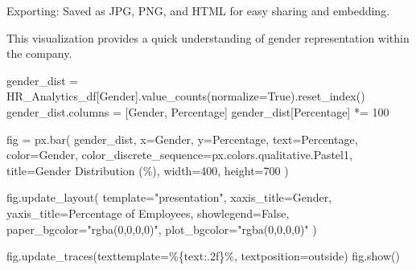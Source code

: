 \documentclass[
  letterpaper,
  DIV=11,
  numbers=noendperiod]{scrartcl}
\newenvironment{Shaded}{\begin{snugshade}}{\end{snugshade}}
\newcommand{\DecValTok}[1]{\textcolor[rgb]{0.68,0.00,0.00}{#1}}
\newcommand{\NormalTok}[1]{\textcolor[rgb]{0.00,0.23,0.31}{#1}}
\newcommand{\OperatorTok}[1]{\textcolor[rgb]{0.37,0.37,0.37}{#1}}
\newcommand{\SpecialCharTok}[1]{\textcolor[rgb]{0.37,0.37,0.37}{#1}}
\newcommand{\StringTok}[1]{\textcolor[rgb]{0.13,0.47,0.30}{#1}}
\newcommand{\VariableTok}[1]{\textcolor[rgb]{0.07,0.07,0.07}{#1}}
\begin{document}
Exporting: Saved as JPG, PNG, and HTML for easy sharing and embedding.

This visualization provides a quick understanding of gender
representation within the company.

\begin{Shaded}
\begin{Highlighting}[]
\NormalTok{gender\_dist }\OperatorTok{=}\NormalTok{ HR\_Analytics\_df[}\StringTok{\textquotesingle{}Gender\textquotesingle{}}\NormalTok{].value\_counts(normalize}\OperatorTok{=}\VariableTok{True}\NormalTok{).reset\_index()}
\NormalTok{gender\_dist.columns }\OperatorTok{=}\NormalTok{ [}\StringTok{\textquotesingle{}Gender\textquotesingle{}}\NormalTok{, }\StringTok{\textquotesingle{}Percentage\textquotesingle{}}\NormalTok{]}
\NormalTok{gender\_dist[}\StringTok{\textquotesingle{}Percentage\textquotesingle{}}\NormalTok{] }\OperatorTok{*=} \DecValTok{100}

\NormalTok{fig }\OperatorTok{=}\NormalTok{ px.bar(}
\NormalTok{    gender\_dist,}
\NormalTok{    x}\OperatorTok{=}\StringTok{\textquotesingle{}Gender\textquotesingle{}}\NormalTok{,}
\NormalTok{    y}\OperatorTok{=}\StringTok{\textquotesingle{}Percentage\textquotesingle{}}\NormalTok{,}
\NormalTok{    text}\OperatorTok{=}\StringTok{\textquotesingle{}Percentage\textquotesingle{}}\NormalTok{,}
\NormalTok{    color}\OperatorTok{=}\StringTok{\textquotesingle{}Gender\textquotesingle{}}\NormalTok{,}
\NormalTok{    color\_discrete\_sequence}\OperatorTok{=}\NormalTok{px.colors.qualitative.Pastel1,}
\NormalTok{    title}\OperatorTok{=}\StringTok{\textquotesingle{}Gender Distribution (\%)\textquotesingle{}}\NormalTok{,}
\NormalTok{    width}\OperatorTok{=}\DecValTok{400}\NormalTok{,     }
\NormalTok{    height}\OperatorTok{=}\DecValTok{700}    
\NormalTok{)}

\NormalTok{fig.update\_layout(}
\NormalTok{    template}\OperatorTok{=}\StringTok{"presentation"}\NormalTok{,}
\NormalTok{    xaxis\_title}\OperatorTok{=}\StringTok{\textquotesingle{}Gender\textquotesingle{}}\NormalTok{,}
\NormalTok{    yaxis\_title}\OperatorTok{=}\StringTok{\textquotesingle{}Percentage of Employees\textquotesingle{}}\NormalTok{,}
\NormalTok{    showlegend}\OperatorTok{=}\VariableTok{False}\NormalTok{,}
\NormalTok{    paper\_bgcolor}\OperatorTok{=}\StringTok{"rgba(0,0,0,0)"}\NormalTok{,}
\NormalTok{    plot\_bgcolor}\OperatorTok{=}\StringTok{"rgba(0,0,0,0)"}
\NormalTok{)}

\NormalTok{fig.update\_traces(texttemplate}\OperatorTok{=}\StringTok{\textquotesingle{}\%}\SpecialCharTok{\{text:.2f\}}\StringTok{\%\textquotesingle{}}\NormalTok{, textposition}\OperatorTok{=}\StringTok{\textquotesingle{}outside\textquotesingle{}}\NormalTok{)}
\NormalTok{fig.show()}


\end{Highlighting}
\end{Shaded}
\end{document}
